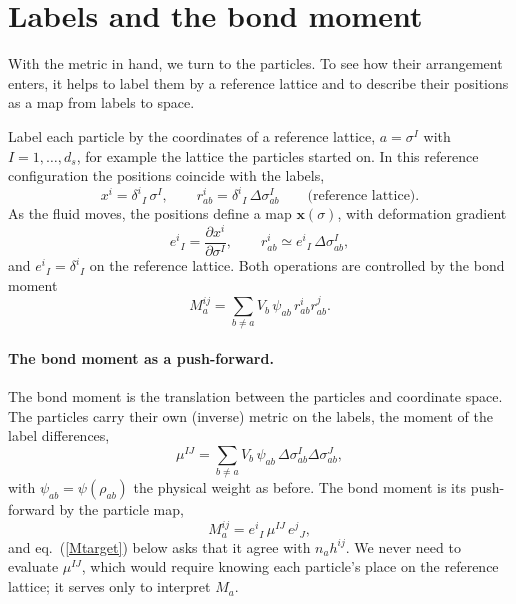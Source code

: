 \documentclass[11pt,aps,preprint,nofootinbib,superscriptaddress,tightenlines]{revtex4-2}
\def\st{\begin{equation}}
\def\stp{\end{equation}}
\def\Eq#1{eq.~(\ref{#1})}
\let\oldparagraph\paragraph
\renewcommand{\paragraph}{\par\medskip\oldparagraph}
\begin{document}
\section{Labels and the bond moment}
\label{sec:labels}

With the metric in hand, we turn to the particles.  To see how their
arrangement enters, it helps to label them by a reference lattice and to
describe their positions as a map from labels to space.

Label each particle by the coordinates of a reference lattice, $a=\sigma^I$ with
$I=1,\dots,d_s$, for example the lattice the particles started on.  In this
reference configuration the positions coincide with the labels,
\st
x^i=\delta^i{}_I\,\sigma^I,\qquad r^i_{ab}=\delta^i{}_I\,\Delta\sigma^I_{ab}\qquad\text{(reference lattice)} .
\stp
As the fluid moves, the positions define a map $\bm x(\sigma)$, with deformation gradient
\st
e^i{}_I=\frac{\partial x^i}{\partial\sigma^I},\qquad
r^i_{ab}\simeq e^i{}_I\,\Delta\sigma^I_{ab} ,
\stp
and $e^i{}_I=\delta^i{}_I$ on the reference lattice.
Both operations are controlled by the bond moment
\st
M_a^{ij}=\sum_{b\neq a}V_b\,\psi_{ab}\,r^i_{ab}r^j_{ab} .
\label{Mdef}
\stp

\paragraph{The bond moment as a push-forward.}  The bond moment is the
translation between the particles and coordinate space.  The particles carry
their own (inverse) metric on the labels, the moment of the label differences,
\st
\mu^{IJ}=\sum_{b\neq a}V_b\,\psi_{ab}\,\Delta\sigma^I_{ab}\Delta\sigma^J_{ab} ,
\label{mudef}
\stp
with $\psi_{ab}=\psi(\rho_{ab})$ the physical weight as before.  The bond moment is
its push-forward by the particle map,
\st
M_a^{ij}=e^i{}_I\,\mu^{IJ}\,e^j{}_J ,
\label{pushforward}
\stp
and \Eq{Mtarget} below asks that it agree with $n_a h^{ij}$.  We never need to
evaluate $\mu^{IJ}$, which would require knowing each particle's place on the
reference lattice; it serves only to interpret $M_a$.
\end{document}

